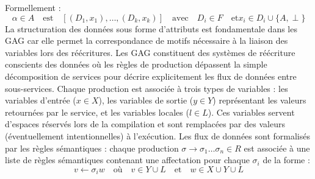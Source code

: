 Formellement :
\begin{equation}
    \alpha \in A \quad \text{est} \quad [(D_1,x_1), \ldots ,(D_k,x_k)] \quad \text{avec} \quad D_i \in F \quad \text{et} x_i \in D_i \cup \{A,\perp\} 
\end{equation}
La structuration des données sous forme d'attributs est fondamentale dans les GAG car elle permet la correspondance de motifs nécessaire à la liaison des variables lors des réécritures. Les GAG constituent des systèmes de réécriture conscients des données où les règles de production dépassent la simple décomposition de services pour décrire explicitement les flux de données entre sous-services.
Chaque production est associée à trois types de variables : les variables d'entrée ($x \in X$), les variables de sortie ($y \in Y$) représentant les valeurs retournées par le service, et les variables locales ($l \in L$). Ces variables servent d'espaces réservés lors de la compilation et sont remplacées par des valeurs (éventuellement intentionnelles) à l'exécution.
Les flux de données sont formalisés par les règles sémantiques : chaque production $\sigma \rightarrow \sigma_1 \ldots \sigma_n \in R$ est associée à une liste de règles sémantiques contenant une affectation pour chaque $\sigma_i$ de la forme :
\begin{equation}
    v \leftarrow \sigma_iw \quad \text{où} \quad v \in Y \cup L \quad \text{et} \quad w \in X \cup Y \cup L 
\end{equation}
